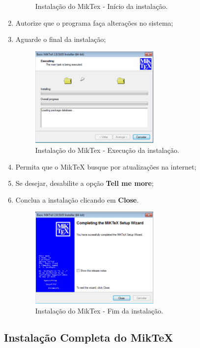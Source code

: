 \begin{enumerate}
\begin{figure}[H]
  \caption{Instalação do MikTex - Início da instalação.}
\end{figure}
\item Autorize que o programa faça alterações no sistema;
\item Aguarde o final da instalação;
\begin{figure}[H]
  \centering
  \includegraphics[width=0.6\textwidth]{./fig/miktex07}
  \caption{Instalação do MikTex - Execução da instalação.}
\end{figure}
\item Permita que o MikTeX busque por atualizações na internet;
\item Se desejar, desabilite a opção \textbf{Tell me more};
\item Conclua a instalação clicando em \textbf{Close}.
\begin{figure}[H]
  \centering
  \includegraphics[width=0.6\textwidth]{./fig/miktex08}
  \caption{Instalação do MikTex - Fim da instalação.}
\end{figure}
\end{enumerate}

\subsection{Instalação Completa do MikTeX}

